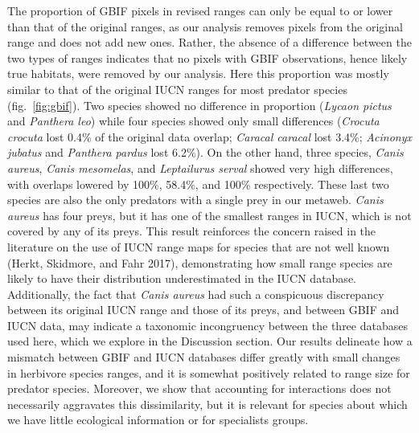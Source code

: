 \documentclass[10pt,oneside]{article}
\begin{document}
The proportion of GBIF pixels in revised ranges can only be equal to or
lower than that of the original ranges, as our analysis removes pixels
from the original range and does not add new ones. Rather, the absence
of a difference between the two types of ranges indicates that no pixels
with GBIF observations, hence likely true habitats, were removed by our
analysis. Here this proportion was mostly similar to that of the
original IUCN ranges for most predator species (fig.~\ref{fig:gbif}).
Two species showed no difference in proportion (\emph{Lycaon pictus} and
\emph{Panthera leo}) while four species showed only small differences
(\emph{Crocuta crocuta} lost 0.4\% of the original data overlap;
\emph{Caracal caracal} lost 3.4\%; \emph{Acinonyx jubatus} and
\emph{Panthera pardus} lost 6.2\%). On the other hand, three species,
\emph{Canis aureus}, \emph{Canis mesomelas}, and \emph{Leptailurus
serval} showed very high differences, with overlaps lowered by 100\%,
58.4\%, and 100\% respectively. These last two species are also the only
predators with a single prey in our metaweb. \emph{Canis aureus} has
four preys, but it has one of the smallest ranges in IUCN, which is not
covered by any of its preys. This result reinforces the concern raised
in the literature on the use of IUCN range maps for species that are not
well known (Herkt, Skidmore, and Fahr 2017), demonstrating how small
range species are likely to have their distribution underestimated in
the IUCN database. Additionally, the fact that \emph{Canis aureus} had
such a conspicuous discrepancy between its original IUCN range and those
of its preys, and between GBIF and IUCN data, may indicate a taxonomic
incongruency between the three databases used here, which we explore in
the Discussion section. Our results delineate how a mismatch between
GBIF and IUCN databases differ greatly with small changes in herbivore
species ranges, and it is somewhat positively related to range size for
predator species. Moreover, we show that accounting for interactions
does not necessarily aggravates this dissimilarity, but it is relevant
for species about which we have little ecological information or for
specialists groups.
\end{document}
